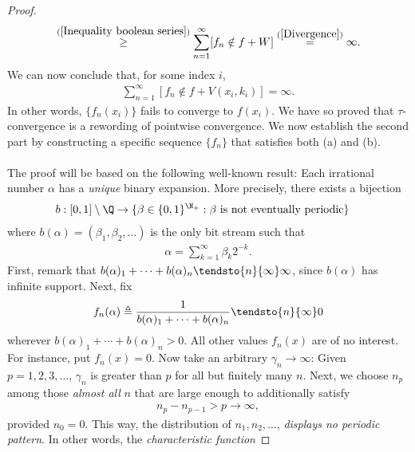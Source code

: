 \begin{proof}
\begin{align}
      \overset{(\ref{Inequality boolean series})}{\geq}
  \sum_{n=1}^\infty [f_n \notin f + W]
    \overset{(\ref{Divergence})}{=}
  \infty .
\end{align}
%
We can now conclude that, for some index $i$, 
%
\begin{align}
  \sum_{n=1}^\infty [f_n \notin f + V(x_i, k_i)] = \infty .
\end{align}
%
In other words, $\{f_n(x_i)\}$ fails to converge to $f(x_i)$. We have so %
proved that $\tau$-convergence is a rewording of pointwise convergence. %
%
We now establish the second part by constructing a specific sequence %
$\{f_n\}$ that satisfies both (a) and (b). \\
\\
The proof will be based on the following well-known result: %
Each irrational number $\alpha$ has a \textit{unique} binary expansion. %
More precisely, there exists a bijection %
%
\begin{align}
  b: [0, 1] \setminus \Q &\to \{ 
      \beta \in \{0, 1\}^{\N_+}: \beta \text{ is not eventually periodic}
    \}
\end{align}
where %
%
  $b(\alpha) = (\beta_1, \beta_2, \dots)$ %
%
is the only bit stream such that %
%
\begin{align}
  \label{definition of alpha}
  \alpha = \sum_{k=1}^\infty \beta_k 2^{\minus k}.
\end{align}
%
First, remark that %
%
$b(\alpha)_1 + \dots + b(\alpha)_n \tendsto{n}{\infty}\infty$, %
%
since %
%
$b(\alpha)$
%
has infinite support. Next, fix %
%
\begin{equation}
  \label{definition of f_n(alpha)}
  f_n(\alpha)\triangleq %
  \frac{1}{b(\alpha)_1 + \cdots + b(\alpha)_n} \tendsto{n}{\infty} 0
\end{equation}
%
wherever $b(\alpha)_1+ \cdots + b(\alpha)_n > 0$. %
All other values $f_n(x)$ are of no interest. %
For instance, put $f_n(x) = 0$. %
%
Now take an arbitrary %
%
$\gamma_n \longrightarrow \infty$: %
%
Given $p=1, 2, 3, \dots$, $\gamma_n$ is greater than $p$ %
for all but finitely many $n$. %
%
Next, we choose $n_p$ among those \textit{almost all} $n$ that are 
large enough to additionally satisfy %
%
\begin{align}
  \label{definition of n_p}
  n_p - n_{p-1} > p \longrightarrow \infty, 
\end{align}
%
provided $n_0=0$. This way, the distribution of %
%
  $n_1, n_2, \dots$, %
%
\textit{displays no periodic pattern}. %
In other words, the \textit{characteristic function} %

\end{proof}
